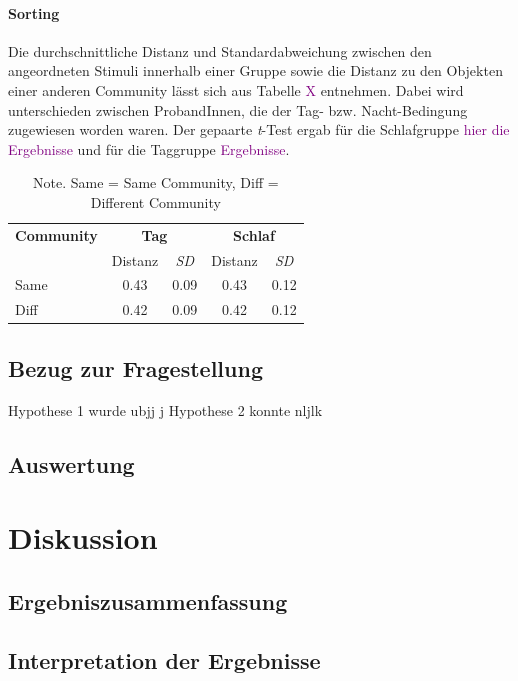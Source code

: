 \paragraph{Sorting}
Die durchschnittliche Distanz und Standardabweichung zwischen den angeordneten Stimuli innerhalb einer Gruppe sowie die Distanz zu den Objekten einer anderen Community lässt sich aus Tabelle \textcolor{purple}{X} entnehmen. Dabei wird unterschieden zwischen ProbandInnen, die der Tag- bzw. Nacht-Bedingung zugewiesen worden waren. Der gepaarte \textit{t}-Test ergab für die Schlafgruppe \textcolor{purple}{hier die Ergebnisse} und für die Taggruppe \textcolor{purple}{Ergebnisse}.

\begin{table}[h]
\centering
\captionsetup{justification=centering, margin = 1cm}
\begin{tabular}{l c c c c} %
\hline
\textbf{Community} & \multicolumn{2}{c}{\textbf{Tag}} &  \multicolumn{2}{c}{\textbf{Schlaf}}\\
& Distanz & \textit{SD} & Distanz & \textit{SD} \\
\hline
Same & 0.43 & 0.09 & 0.43 & 0.12\\
Diff & 0.42 & 0.09 & 0.42 & 0.12\\
\hline
\end{tabular}
\caption{Note. Same = Same Community, Diff = Different Community}
\end{table}


\subsection{Bezug zur Fragestellung}
Hypothese 1 wurde ubjj j
Hypothese 2 konnte nljlk

\subsection{Auswertung}

\section{Diskussion}
\label{S:4}
\subsection{Ergebniszusammenfassung}


\subsection{Interpretation der Ergebnisse}

